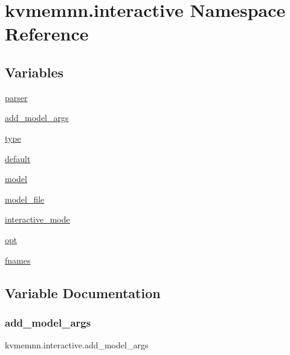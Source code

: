 \hypertarget{namespacekvmemnn_1_1interactive}{}\section{kvmemnn.\+interactive Namespace Reference}
\label{namespacekvmemnn_1_1interactive}
\subsection*{Variables}
\begin{DoxyCompactItemize}
\item 
\hyperlink{namespacekvmemnn_1_1interactive_a41ec9f716f2080d80444749f7b969728}{parser}
\item 
\hyperlink{namespacekvmemnn_1_1interactive_a01daf0f3da5f90af0ddfd1307850b28a}{add\+\_\+model\+\_\+args}
\item 
\hyperlink{namespacekvmemnn_1_1interactive_a1698554012c0b91bef3ece564e11f393}{type}
\item 
\hyperlink{namespacekvmemnn_1_1interactive_a44460dfb8b38df44b326bed453a8863b}{default}
\item 
\hyperlink{namespacekvmemnn_1_1interactive_aa1e0ba6e8a4242599950851699ed6f95}{model}
\item 
\hyperlink{namespacekvmemnn_1_1interactive_a66c8086201de36060b4e32ca65c31a9c}{model\+\_\+file}
\item 
\hyperlink{namespacekvmemnn_1_1interactive_a07ca830b1f38e5179e3b0d40fb16eec3}{interactive\+\_\+mode}
\item 
\hyperlink{namespacekvmemnn_1_1interactive_a70f6d84eb79dac9243d23588351c6351}{opt}
\item 
\hyperlink{namespacekvmemnn_1_1interactive_ac625e954383b5ad1ccc81c5d36f5589b}{fnames}
\end{DoxyCompactItemize}


\subsection{Variable Documentation}
\mbox{\label{namespacekvmemnn_1_1interactive_a01daf0f3da5f90af0ddfd1307850b28a}} 
\subsubsection{\texorpdfstring{add\+\_\+model\+\_\+args}{add\_model\_args}}
{\footnotesize\ttfamily kvmemnn.\+interactive.\+add\+\_\+model\+\_\+args}



